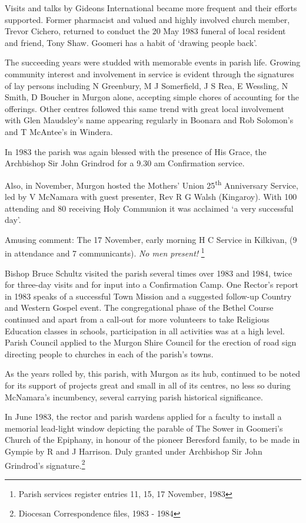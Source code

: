 Visits and talks by Gideons International became more frequent and their efforts supported. Former pharmacist and valued and highly involved church member, Trevor Cichero, returned to conduct the 20 May 1983 funeral of local resident and friend, Tony Shaw. Goomeri has a habit of `drawing people back'.

The succeeding years were studded with memorable events in parish life. Growing community interest and involvement in service is evident through the signatures of lay persons including N Greenbury, M J Somerfield, J S Rea, E Wessling, N Smith, D Boucher in Murgon alone, accepting simple chores of accounting for the offerings. Other centres followed this same trend with great local involvement with Glen Maudsley's name appearing regularly in Boonara and Rob Solomon's and T McAntee's in Windera.

In 1983 the parish was again blessed with the presence of His Grace, the Archbishop Sir John Grindrod for a 9.30 am Confirmation service.

Also, in November, Murgon hosted the Mothers' Union 25\textsuperscript{th} Anniversary Service, led by V McNamara with guest presenter, Rev R G Walsh (Kingaroy). With 100 attending and 80 receiving Holy Communion it was acclaimed `a very successful day'.

Amusing comment: The 17 November, early morning H C Service in Kilkivan, (9 in attendance and 7 communicants). \emph{No men present!} \footnote{Parish services register entries 11, 15, 17 November, 1983}

Bishop Bruce Schultz visited the parish several times over 1983 and 1984, twice for three-day visits and for input into a Confirmation Camp. One Rector's report in 1983 speaks of a successful Town Mission and a suggested follow-up Country and Western Gospel event. The congregational phase of the Bethel Course continued and apart from a call-out for more volunteers to take Religious Education classes in schools, participation in all activities was at a high level. Parish Council applied to the Murgon Shire Council for the erection of road sign directing people to churches in each of the parish's towns.

As the years rolled by, this parish, with Murgon as its hub, continued to be noted for its support of projects great and small in all of its centres, no less so during McNamara's incumbency, several carrying parish historical significance.

In June 1983, the rector and parish wardens applied for a faculty to install a memorial lead-light window depicting the parable of The Sower in Goomeri's Church of the Epiphany, in honour of the pioneer Beresford family, to be made in Gympie by R and J Harrison. Duly granted under Archbishop Sir John Grindrod's signature.\footnote{Diocesan Correspondence files, 1983 - 1984}

